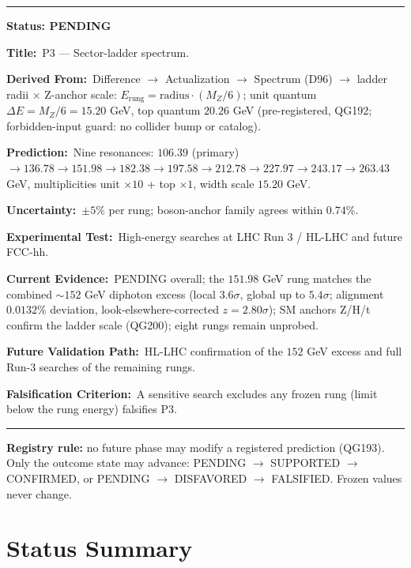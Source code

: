 \documentclass[11pt,a4paper]{article}
\newcommand{\predstart}[2]{%
  \par\medskip\noindent\hrule\par\smallskip
  \noindent{\large\bfseries #1}\hfill{\bfseries Status: #2}\par\smallskip
}
\newcommand{\pfield}[2]{%
  \noindent\textbf{#1:}~#2\par\smallskip
}
\begin{document}
\predstart{AT-P041}{PENDING}
\pfield{Title}{P3 --- Sector-ladder spectrum.}
\pfield{Derived From}{Difference $\to$ Actualization $\to$ Spectrum (D96) $\to$ ladder
radii $\times$ Z-anchor scale: $E_{\mathrm{rung}} = \mathrm{radius}\cdot(M_Z/6)$; unit
quantum $\Delta E = M_Z/6 = 15.20$ GeV, top quantum $20.26$ GeV (pre-registered, QG192;
forbidden-input guard: no collider bump or catalog).}
\pfield{Prediction}{Nine resonances: $106.39$ (primary) $\to 136.78 \to 151.98 \to 182.38
\to 197.58 \to 212.78 \to 227.97 \to 243.17 \to 263.43$ GeV, multiplicities unit
$\times 10$ + top $\times 1$, width scale $15.20$ GeV.}
\pfield{Uncertainty}{$\pm5\%$ per rung; boson-anchor family agrees within $0.74\%$.}
\pfield{Experimental Test}{High-energy searches at LHC Run 3 / HL-LHC and future
FCC-hh.}
\pfield{Current Evidence}{PENDING overall; the $151.98$ GeV rung matches the combined
$\sim152$ GeV diphoton excess (local $3.6\sigma$, global up to $5.4\sigma$; alignment
$0.0132\%$ deviation, look-elsewhere-corrected $z = 2.80\sigma$); SM anchors Z/H/t confirm
the ladder scale (QG200); eight rungs remain unprobed.}
\pfield{Future Validation Path}{HL-LHC confirmation of the $152$ GeV excess and full
Run-3 searches of the remaining rungs.}
\pfield{Falsification Criterion}{A sensitive search excludes any frozen rung (limit below
the rung energy) falsifies P3.}

\medskip
\noindent\hrule\par\smallskip
\noindent
\textbf{Registry rule:} no future phase may modify a registered prediction (QG193). Only the
outcome state may advance: PENDING $\to$ SUPPORTED $\to$ CONFIRMED, or PENDING $\to$
DISFAVORED $\to$ FALSIFIED. Frozen values never change.

\section*{Status Summary}
\label{sec:summary}
\end{document}
